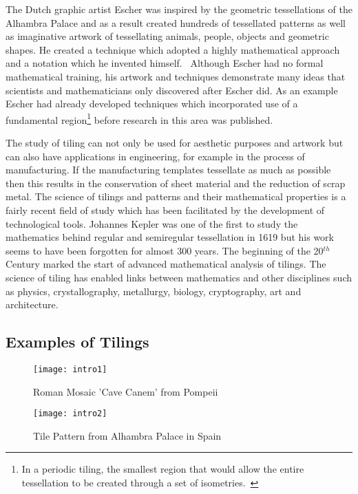 \documentclass[a4paper,12pt,twoside,abstraction,titlepage]{article}
\theoremstyle{remark}
\theoremstyle{definition}
\begin{document}
The Dutch graphic artist Escher was inspired by the geometric tessellations of the Alhambra Palace and as a result created hundreds of tessellated patterns as well as imaginative artwork of tessellating animals, people, objects and geometric shapes. He created a technique which adopted a highly mathematical approach and a notation which he invented himself.~\cite{escher} Although Escher had no formal mathematical training, his artwork and techniques demonstrate many ideas that scientists and mathematicians only discovered after Escher did. As an example Escher had already developed techniques which incorporated use of a fundamental region\footnote{In a periodic tiling, the smallest region that would allow the entire tessellation to be created through a set of isometries.~\cite{scienceu}} before research in this area was published.~\cite{totally}

The study of tiling can not only be used for aesthetic purposes and artwork but can also have applications in engineering, for example in the process of manufacturing. If the manufacturing templates tessellate as much as possible then this results in the conservation of sheet material and the reduction of scrap metal. The science of tilings and patterns and their mathematical properties is a fairly recent field of study which has been facilitated by the development of technological tools. Johannes Kepler was one of the first to study the mathematics behind regular and semiregular tessellation in 1619 but his work seems to have been forgotten for almost 300 years. The beginning of the 20$^{th}$ Century marked the start of advanced mathematical analysis of tilings.  The science of tiling has enabled links between mathematics and other disciplines such as physics, crystallography, metallurgy, biology, cryptography, art and architecture.~\cite{totally}

\subsection{Examples of Tilings}

\begin{figure}[h]
\begin{center}
\texttt{[image: intro1]}
\caption{Roman Mosaic 'Cave Canem' from Pompeii~{\cite{UOS}}}
\end{center}
\end{figure}

\begin{figure}[h]
\begin{center}
\texttt{[image: intro2]}
\caption{Tile Pattern from Alhambra Palace in Spain~\cite{UOC}}
\end{center}
\end{figure}
\end{document}
